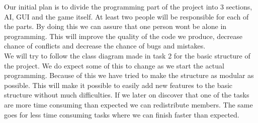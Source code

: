 \documentclass{article}
\begin{document}
    \noindent
    Our initial plan is to divide the programming part of the project into 3 sections, AI, GUI and the game itself. At least two people will be responsible for each of the parts. By doing this we can assure that one person wont be alone in programming. This will improve the quality of the code we produce, decrease chance of conflicts and decrease the chance of bugs and mistakes. \\
    \noindent
    We will try to follow the class diagram made in task 2 for the basic structure of the project. We do expect some of this to change as we start the actual programming. Because of this we have tried to make the structure as modular as possible. This will make it possible to easily add new features to the basic structure without much difficulties. If we later on discover that one of the tasks are more time consuming than expected we can redistribute members. The same goes for less time consuming tasks where we can finish faster than expected. \\
\end{document}
